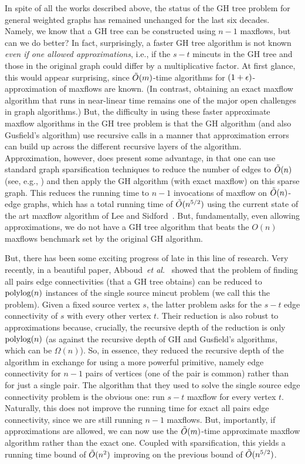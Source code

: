 In spite of all the works described above, the status of the GH tree problem for general weighted graphs has remained unchanged for the last six decades. Namely, we know that a GH tree can be constructed using $n-1$ maxflows, but can we do better? In fact, surprisingly, a faster GH tree algorithm is not known {\em even if one allowed approximations}, i.e., if the $s-t$ mincuts in the GH tree and those in the original graph could differ by a multiplicative factor. At first glance, this would appear surprising, since $\tilde{O}(m)$-time algorithms for  $(1+\epsilon)$-approximation of maxflows are known. (In contrast, obtaining an exact maxflow algorithm that runs in near-linear time remains one of the major open challenges in graph algorithms.) But, the difficulty in using these faster approximate maxflow algorithms in the GH tree problem is that the GH algorithm (and also Gusfield's algorithm) use recursive calls in a manner that approximation errors can build up across the different recursive layers of the algorithm. Approximation, however, does present some advantage, in that one can use standard graph sparsification techniques to reduce the number of edges to $\tilde{O}(n)$ (see, e.g., \cite{BenczurK15,FungHHP19}) and then apply the GH algorithm (with exact maxflow) on this sparse graph. This reduces the running time to $n-1$ invocations of maxflow on $\tilde{O}(n)$-edge graphs, which has a total running time of $\tilde{O}(n^{5/2})$ using the current state of the art maxflow algorithm of Lee and Sidford~\cite{LeeSflow}. But, fundamentally, even allowing approximations, we do not have a GH tree algorithm that beats the $O(n)$ maxflows benchmark set by the original GH algorithm.

But, there has been some exciting progress of late in this line of research. Very recently, in a beautiful paper, Abboud~{\em et al.}~\cite{AbboudKT20b} showed that the problem of finding all pairs edge connectivities (that a GH tree obtains) can be reduced to $\textup{polylog}(n)$ instances of the single source mincut problem (we call this the \ssc problem). Given a fixed source vertex $s$, the latter problem asks for the $s-t$ edge connectivity of $s$ with every other vertex $t$. Their reduction is also robust to approximations because, crucially, the recursive depth of the reduction is only $\textup{polylog}(n)$ (as against the recursive depth of GH and Gusfield's algorithms, which can be $\Omega(n)$). So, in essence, they reduced the recursive depth of the algorithm in exchange for using a more powerful primitive, namely edge connectivity for $n-1$ pairs of vertices (one of the pair is common) rather than for just a single pair. The algorithm that they used to solve the single source edge connectivity problem is the obvious one: run $s-t$ maxflow for every vertex $t$. Naturally, this does not improve the running time for exact all pairs edge connectivity, since we are still running $n-1$ maxflows. But, importantly, if approximations are allowed, we can now use the $\tilde{O}(m)$-time approximate maxflow algorithm rather than the exact one. Coupled with sparsification, this yields a running time bound of $\tilde{O}(n^2)$ improving on the previous bound of $\tilde{O}(n^{5/2})$. 

